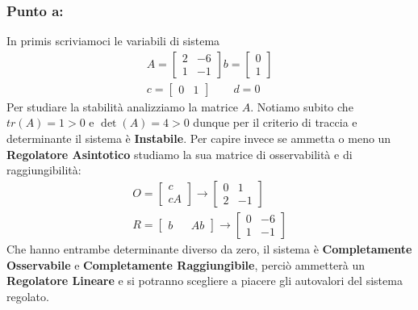 \documentclass[a4paper]{report}
\begin{document}
\subsubsection*{Punto a:}
In primis scriviamoci le variabili di sistema
\begin{align*}
A=\begin{bmatrix}
2 & -6\\
1 & -1
\end{bmatrix} b=\begin{bmatrix}
0\\ 1
\end{bmatrix}\\
c=\begin{bmatrix}
0 & 1
\end{bmatrix} \quad \quad d=0
\end{align*}
Per studiare la stabilità analizziamo la matrice $A$. Notiamo subito che $tr(A)=1>0$ e $\det(A)=4>0$ dunque per il criterio di traccia e determinante il sistema è \textbf{Instabile}. Per capire invece  se ammetta o meno un \textbf{Regolatore Asintotico} studiamo la sua matrice di osservabilità e di raggiungibilità:
\begin{align*}
O=\begin{bmatrix}
c\\
cA
\end{bmatrix}\longrightarrow\begin{bmatrix}
0 & 1 \\
2 & -1
\end{bmatrix}\\
R=\begin{bmatrix}
b && Ab
\end{bmatrix}\longrightarrow\begin{bmatrix}
0 & -6 \\
1 & -1
\end{bmatrix}
\end{align*}
Che hanno entrambe determinante diverso da zero, il sistema è \textbf{Completamente Osservabile}  e \textbf{Completamente Raggiungibile}, perciò ammetterà un \textbf{Regolatore Lineare} e si potranno scegliere a piacere gli autovalori del sistema regolato.
\end{document}
